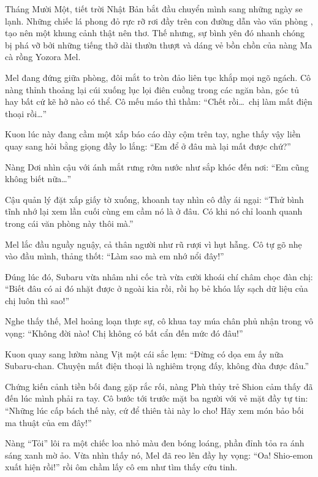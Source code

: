 \documentclass[../main.tex]{subfiles}
\begin{document}
Tháng Mười Một, tiết trời Nhật Bản bắt đầu chuyển mình sang những ngày se lạnh. Những chiếc lá phong đỏ rực rỡ rơi đầy trên con đường dẫn vào văn phòng \hll, tạo nên một khung cảnh thật nên thơ. Thế nhưng, sự bình yên đó nhanh chóng bị phá vỡ bởi những tiếng thở dài thườn thượt và dáng vẻ bồn chồn của nàng Ma cà rồng Yozora Mel.

Mel đang đứng giữa phòng, đôi mắt to tròn đảo liên tục khắp mọi ngõ ngách. Cô nàng thỉnh thoảng lại cúi xuống lục lọi điên cuồng trong các ngăn bàn, góc tủ hay bất cứ kẽ hở nào có thể. Cô mếu máo thì thầm: ``Chết rồi\dots\ chị làm mất điện thoại rồi\dots''

Kuon lúc này đang cầm một xấp báo cáo dày cộm trên tay, nghe thấy vậy liền quay sang hỏi bằng giọng đầy lo lắng: ``Em để ở đâu mà lại mất được chứ?''

Nàng Dơi nhìn cậu với ánh mắt rưng rớm nước như sắp khóc đến nơi: ``Em cũng không biết nữa\dots''

Cậu quản lý đặt xấp giấy tờ xuống, khoanh tay nhìn cô đầy ái ngại: ``Thử bình tĩnh nhớ lại xem lần cuối cùng em cầm nó là ở đâu. Có khi nó chỉ loanh quanh trong cái văn phòng này thôi mà.''

Mel lắc đầu nguầy nguậy, cả thân người như rũ rượi vì hụt hẫng. Cô tự gõ nhẹ vào đầu mình, thảng thốt: ``Làm sao mà em nhớ nổi đây!''

Đúng lúc đó, Subaru vừa nhâm nhi cốc trà vừa cười khoái chí châm chọc đàn chị: ``Biết đâu có ai đó nhặt được ở ngoài kia rồi, rồi họ bẻ khóa lấy sạch dữ liệu của chị luôn thì sao!''


Nghe thấy thế, Mel hoảng loạn thực sự, cô khua tay múa chân phủ nhận trong vô vọng: ``Không đời nào! Chị không có bất cẩn đến mức đó đâu!''

Kuon quay sang lườm nàng Vịt một cái sắc lẹm: ``Đừng có dọa em ấy nữa Subaru-chan. Chuyện mất điện thoại là nghiêm trọng đấy, không đùa được đâu.''

Chứng kiến cảnh tiền bối đang gặp rắc rối, nàng Phù thủy trẻ Shion cảm thấy đã đến lúc mình phải ra tay. Cô bước tới trước mặt ba người với vẻ mặt đầy tự tin: ``Những lúc cấp bách thế này, cứ để thiên tài này lo cho! Hãy xem món bảo bối ma thuật của em đây!''

Nàng ``Tỏi'' lôi ra một chiếc loa nhỏ màu đen bóng loáng, phần đỉnh tỏa ra ánh sáng xanh mờ ảo. Vừa nhìn thấy nó, Mel đã reo lên đầy hy vọng: ``Oa! Shio-emon xuất hiện rồi!'' rồi ôm chầm lấy cô em như tìm thấy cứu tinh.
\end{document}
